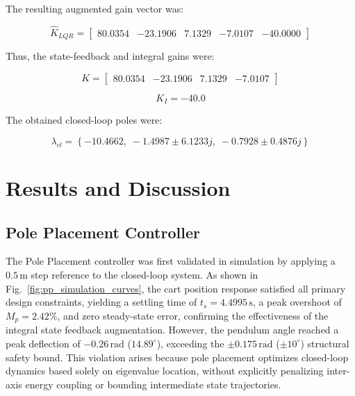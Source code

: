 \documentclass[journal,twocolumn]{IEEEtran}
\begin{document}
The resulting augmented gain vector was:

\begin{equation}
\hat{K}_{LQR} =
\begin{bmatrix}
80.0354 & -23.1906 & 7.1329 & -7.0107 & -40.0000
\end{bmatrix}
\end{equation}

Thus, the state-feedback and integral gains were:

\begin{equation}
K =
\begin{bmatrix}
80.0354 & -23.1906 & 7.1329 & -7.0107
\end{bmatrix}
\end{equation}

\begin{equation}
K_I = -40.0
\end{equation}

The obtained closed-loop poles were:

\begin{equation}
\lambda_{cl} = \left\{
-10.4662,\;
-1.4987 \pm 6.1233j,\;
-0.7928 \pm 0.4876j
\right\}
\end{equation}

\section{Results and Discussion}

\subsection{Pole Placement Controller}

The Pole Placement controller was first validated in simulation by applying a 
$0.5\,\text{m}$ step reference to the closed-loop system. As shown in 
Fig.~\ref{fig:pp_simulation_curves}, the cart position response satisfied all 
primary design constraints, yielding a settling time of $t_s = 4.4995\,\text{s}$, 
a peak overshoot of $M_p = 2.42\%$, and zero steady-state error, confirming the 
effectiveness of the integral state feedback augmentation. However, the pendulum 
angle reached a peak deflection of $-0.26\,\text{rad}$ ($14.89^\circ$), exceeding 
the $\pm0.175\,\text{rad}$ ($\pm10^\circ$) structural safety bound. This violation 
arises because pole placement optimizes closed-loop dynamics based solely on 
eigenvalue location, without explicitly penalizing inter-axis energy coupling or 
bounding intermediate state trajectories.
\end{document}
